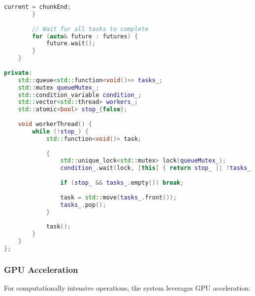 \begin{lstlisting}[language=C++, caption=Advanced Task Queue System]
            current = chunkEnd;
        }
        
        // Wait for all tasks to complete
        for (auto& future : futures) {
            future.wait();
        }
    }
    
private:
    std::queue<std::function<void()>> tasks_;
    std::mutex queueMutex_;
    std::condition_variable condition_;
    std::vector<std::thread> workers_;
    std::atomic<bool> stop_{false};
    
    void workerThread() {
        while (!stop_) {
            std::function<void()> task;
            
            {
                std::unique_lock<std::mutex> lock(queueMutex_);
                condition_.wait(lock, [this] { return stop_ || !tasks_.empty(); });
                
                if (stop_ && tasks_.empty()) break;
                
                task = std::move(tasks_.front());
                tasks_.pop();
            }
            
            task();
        }
    }
};
\end{lstlisting}

\subsubsection{GPU Acceleration}

For computationally intensive operations, the system leverages GPU acceleration:

